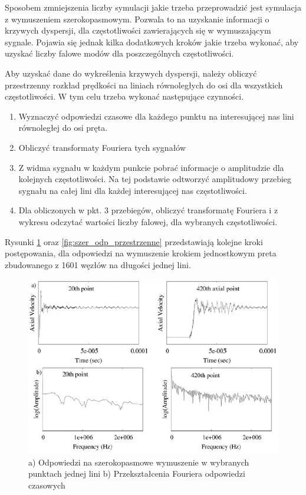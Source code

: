\vspace{3mm}

Sposobem zmniejszenia liczby symulacji jakie trzeba przeprowadzić jest symulacja z wymuszeniem szerokopasmowym. Pozwala to na uzyskanie informacji o krzywych dyspersji, dla częstotliwości zawierających się w wymuszającym sygnale. Pojawia się jednak kilka dodatkowych kroków jakie trzeba wykonać, aby uzyskać liczby falowe modów dla poszczególnych częstotliwości.

Aby uzyskać dane do wykreślenia krzywych dyspersji, należy obliczyć przestrzenny rozkład prędkości na liniach równoległych do osi dla wszystkich częstotliwości. W tym celu trzeba wykonać następujące czynności.

\begin{enumerate}
  \item Wyznaczyć odpowiedzi czasowe dla każdego punktu na interesującej nas lini równoległej do osi pręta.
  \item Obliczyć transformaty Fouriera tych sygnałów
  \item Z widma sygnału w każdym punkcie pobrać informacje o amplitudzie dla kolejnych częstotliwości. Na tej podstawie odtworzyć amplitudowy przebieg sygnału na całej lini dla każdej interesującej nas częstotliwości.
  \item Dla obliczonych w pkt. 3 przebiegów, obliczyć transformatę Fouriera i z wykresu odczytać wartości liczby falowej, dla wybranych częstotliwości.
\end{enumerate}

Rysunki \ref{fig:szer_odp_czasowe} oraz \ref{fig:szer_odp_przestrzenne} przedstawiają kolejne kroki postępowania, dla odpowiedzi na wymuszenie krokiem jednostkowym preta zbudowanego z 1601 węzłów na długości jednej lini. 

\begin{figure}[h]
\centering
\includegraphics[width=15cm]{Zdjecia/2/widmo_wymuszenia_szerokopasmowe1a}
\caption{a) Odpowiedzi na szerokopasmowe wymuszenie w wybranych punktach jednej lini b) Przekształcenia Fouriera odpowiedzi czasowych \cite{bartek_valsamos}}
\label{fig:szer_odp_czasowe}
\end{figure}

